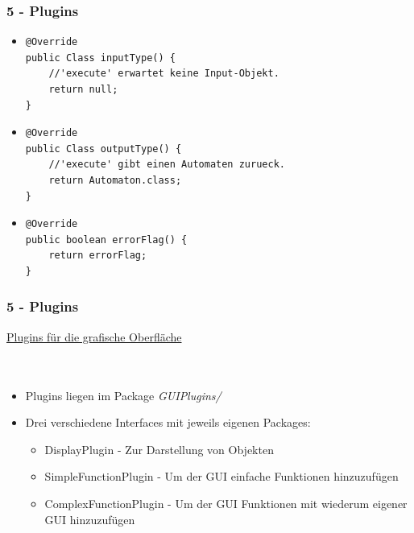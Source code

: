 \documentclass[9pt, xcolor={dvipsnames}]{beamer}
\begin{document}
\begin{frame}[fragile]\frametitle{5 - Plugins}
	\begin{itemize}
		\item[]
		\begin{lstlisting}[frame=single, basicstyle=\tiny]
@Override
public Class inputType() {
	//'execute' erwartet keine Input-Objekt.
	return null;
}
	\end{lstlisting}
	\pause
	\item[]
	\begin{lstlisting}[frame=single, basicstyle=\tiny]
@Override
public Class outputType() {
	//'execute' gibt einen Automaten zurueck.
	return Automaton.class;
}
	\end{lstlisting}
	\pause
	\item[]
	\begin{lstlisting}[frame=single, basicstyle=\tiny]
@Override
public boolean errorFlag() {
	return errorFlag;
}
		\end{lstlisting}
	\end{itemize}
\end{frame}

\begin{frame}\frametitle{5 - Plugins}
	{ \fontsize{20}{20} \selectfont \underline{Plugins für die grafische Oberfläche}}
	\ \\
	\ \\
	\ \\
	\pause
	\begin{itemize}
		\item Plugins liegen im Package \textit{GUIPlugins/}
		\item Drei verschiedene Interfaces mit jeweils eigenen Packages:
		\begin{itemize}
			\item DisplayPlugin - Zur Darstellung von Objekten
			\item SimpleFunctionPlugin - Um der GUI einfache Funktionen hinzuzufügen
			\item ComplexFunctionPlugin - Um der GUI Funktionen mit wiederum eigener GUI hinzuzufügen
		\end{itemize}
	\end{itemize}
\end{frame}
\end{document}
